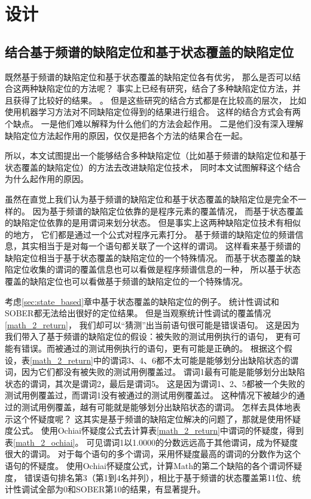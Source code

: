 \chapter{设计}

\section{结合基于频谱的缺陷定位和基于状态覆盖的缺陷定位}
\label{sec:approach_comb}

既然基于频谱的缺陷定位和基于状态覆盖的缺陷定位各有优劣，
那么是否可以结合这两种缺陷定位的方法呢？
事实上已经有研究\parencite{Le2016A,Xuan2014Learning}，结合了多种缺陷定位方法，并且获得了比较好的结果。
。
但是这些研究的结合方式都是在比较高的层次，
比如使用机器学习方法对不同缺陷定位得到的结果进行组合。
这样的结合方式会有两个缺点。
一是他们难以解释为什么他们的方法会起作用。
二是他们没有深入理解缺陷定位方法起作用的原因，仅仅是把各个方法的结果合在一起。

所以，本文试图提出一个能够结合多种缺陷定位（比如基于频谱的缺陷定位和基于状态覆盖的缺陷定位）的方法去改进缺陷定位技术，
同时本文试图解释这个结合为什么起作用的原因。

虽然在直觉上我们认为基于频谱的缺陷定位和基于状态覆盖的缺陷定位是完全不一样的。
因为基于频谱的缺陷定位依靠的是程序元素的覆盖情况，
而基于状态覆盖的缺陷定位依靠的是用谓词来划分状态。
但是事实上这两种缺陷定位技术有相似的地方，
它们都是通过一个公式对程序元素打分。
基于频谱的缺陷定位的频谱信息，其实相当于是对每一个语句都关联了一个这样的谓词。
这样看来基于频谱的缺陷定位相当于基于状态覆盖的缺陷定位的一个特殊情况。
而基于状态覆盖的缺陷定位收集的谓词的覆盖信息也可以看做是程序频谱信息的一种，
所以基于状态覆盖的缺陷定位也可以看做基于频谱的缺陷定位的一个特殊情况。

考虑\ref{sec:state_based}章中基于状态覆盖的缺陷定位的例子。
统计性调试和SOBER都无法给出很好的定位结果。
但是当观察统计性调试的覆盖情况\ref{math_2_return}，
我们却可以“猜测”出当前语句很可能是错误语句。
这是因为我们带入了基于频谱的缺陷定位的假设：被失败的测试用例执行的语句，
更有可能有错误。而被通过的测试用例执行的语句，更有可能是正确的。
根据这个假设，表\ref{math_2_return}中的谓词3、4、6都不太可能是能够划分出缺陷状态的谓词，因为它们都没有被失败的测试用例覆盖过。
谓词1最有可能是能够划分出缺陷状态的谓词，其次是谓词2，最后是谓词5。
这是因为谓词1、2、5都被一个失败的测试用例覆盖过，而谓词1没有被通过的测试用例覆盖过。
这种情况下被越少的通过的测试用例覆盖，越有可能就是能够划分出缺陷状态的谓词。
怎样去具体地表示这个怀疑度呢？
这其实是基于频谱的缺陷定位解决的问题了，那就是使用怀疑度公式。
使用Ochiai怀疑度公式去计算表\ref{math_2_return}中谓词的怀疑度，得到表\ref{math_2_ochiai}。
可见谓词1以1.0000的分数远远高于其他谓词，成为怀疑度很大的谓词。
对于每个语句的多个谓词，采用怀疑度最高的谓词的分数作为这个语句的怀疑度。
使用Ochiai怀疑度公式，计算Math的第二个缺陷的各个谓词怀疑度，
错误语句排名第3（第1到4名并列），相比于基于频谱的状态覆盖第11位、统计性调试全部为0和SOBER第10的结果，有显著提升。

